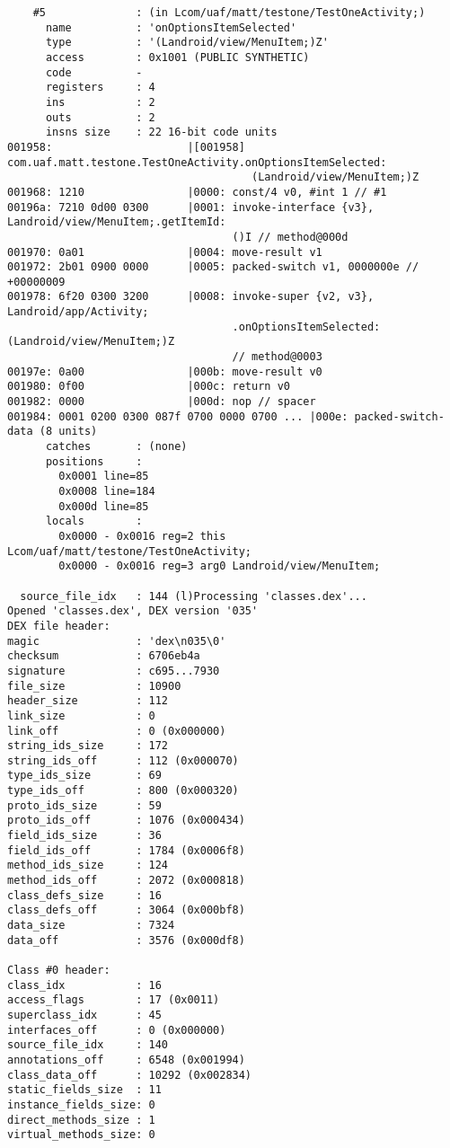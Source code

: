 \begin{lstlisting}
    #5              : (in Lcom/uaf/matt/testone/TestOneActivity;)
      name          : 'onOptionsItemSelected'
      type          : '(Landroid/view/MenuItem;)Z'
      access        : 0x1001 (PUBLIC SYNTHETIC)
      code          -
      registers     : 4
      ins           : 2
      outs          : 2
      insns size    : 22 16-bit code units
001958:                     |[001958] com.uaf.matt.testone.TestOneActivity.onOptionsItemSelected:
                                      (Landroid/view/MenuItem;)Z
001968: 1210                |0000: const/4 v0, #int 1 // #1
00196a: 7210 0d00 0300      |0001: invoke-interface {v3}, Landroid/view/MenuItem;.getItemId:
                                   ()I // method@000d
001970: 0a01                |0004: move-result v1
001972: 2b01 0900 0000      |0005: packed-switch v1, 0000000e // +00000009
001978: 6f20 0300 3200      |0008: invoke-super {v2, v3}, Landroid/app/Activity;
                                   .onOptionsItemSelected:(Landroid/view/MenuItem;)Z
                                   // method@0003
00197e: 0a00                |000b: move-result v0
001980: 0f00                |000c: return v0
001982: 0000                |000d: nop // spacer
001984: 0001 0200 0300 087f 0700 0000 0700 ... |000e: packed-switch-data (8 units)
      catches       : (none)
      positions     :
        0x0001 line=85
        0x0008 line=184
        0x000d line=85
      locals        :
        0x0000 - 0x0016 reg=2 this Lcom/uaf/matt/testone/TestOneActivity;
        0x0000 - 0x0016 reg=3 arg0 Landroid/view/MenuItem;

  source_file_idx   : 144 (l)Processing 'classes.dex'...
Opened 'classes.dex', DEX version '035'
DEX file header:
magic               : 'dex\n035\0'
checksum            : 6706eb4a
signature           : c695...7930
file_size           : 10900
header_size         : 112
link_size           : 0
link_off            : 0 (0x000000)
string_ids_size     : 172
string_ids_off      : 112 (0x000070)
type_ids_size       : 69
type_ids_off        : 800 (0x000320)
proto_ids_size      : 59
proto_ids_off       : 1076 (0x000434)
field_ids_size      : 36
field_ids_off       : 1784 (0x0006f8)
method_ids_size     : 124
method_ids_off      : 2072 (0x000818)
class_defs_size     : 16
class_defs_off      : 3064 (0x000bf8)
data_size           : 7324
data_off            : 3576 (0x000df8)

Class #0 header:
class_idx           : 16
access_flags        : 17 (0x0011)
superclass_idx      : 45
interfaces_off      : 0 (0x000000)
source_file_idx     : 140
annotations_off     : 6548 (0x001994)
class_data_off      : 10292 (0x002834)
static_fields_size  : 11
instance_fields_size: 0
direct_methods_size : 1
virtual_methods_size: 0


\end{lstlisting}
